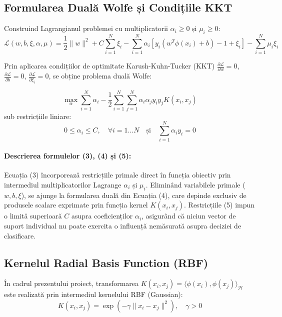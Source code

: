 \documentclass[12pt,a4paper]{report}
\begin{document}
\subsection{Formularea Duală Wolfe și Condițiile KKT}
Construind Lagrangianul problemei cu multiplicatorii $\alpha_i \ge 0$ și $\mu_i \ge 0$:
\begin{equation}
\mathcal{L}(w, b, \xi, \alpha, \mu) = \frac{1}{2} \|w\|^2 + C \sum_{i=1}^{N} \xi_i - \sum_{i=1}^{N} \alpha_i \left[ y_i (w^T \phi(x_i) + b) - 1 + \xi_i \right] - \sum_{i=1}^{N} \mu_i \xi_i
\end{equation}

Prin aplicarea condițiilor de optimitate Karush-Kuhn-Tucker (KKT) $\frac{\partial \mathcal{L}}{\partial w} = 0$, $\frac{\partial \mathcal{L}}{\partial b} = 0$, $\frac{\partial \mathcal{L}}{\partial \xi_i} = 0$, se obține problema duală Wolfe:

\begin{equation}
\max_{\alpha} \sum_{i=1}^{N} \alpha_i - \frac{1}{2} \sum_{i=1}^{N} \sum_{j=1}^{N} \alpha_i \alpha_j y_i y_j K(x_i, x_j)
\end{equation}
sub restricțiile liniare:
\begin{equation}
0 \le \alpha_i \le C, \quad \forall i=1\dots N \quad \text{și} \quad \sum_{i=1}^{N} \alpha_i y_i = 0
\end{equation}

\paragraph{Descrierea formulelor (3), (4) și (5):} 
Ecuația (3) încorporează restricțiile primale direct în funcția obiectiv prin intermediul multiplicatorilor Lagrange $\alpha_i$ și $\mu_i$. Eliminând variabilele primale ($w, b, \xi$), se ajunge la formularea duală din Ecuația (4), care depinde exclusiv de produsele scalare exprimate prin funcția kernel $K(x_i, x_j)$. Restricțiile (5) impun o limită superioară $C$ asupra coeficienților $\alpha_i$, asigurând că niciun vector de suport individual nu poate exercita o influență nemăsurată asupra deciziei de clasificare.

\subsection{Kernelul Radial Basis Function (RBF)}
În cadrul prezentului proiect, transformarea $K(x_i, x_j) = \langle \phi(x_i), \phi(x_j) \rangle_{\mathcal{H}}$ este realizată prin intermediul kernelului RBF (Gaussian):
\begin{equation}
K(x_i, x_j) = \exp \left( -\gamma \|x_i - x_j\|^2 \right), \quad \gamma > 0
\end{equation}
\end{document}
